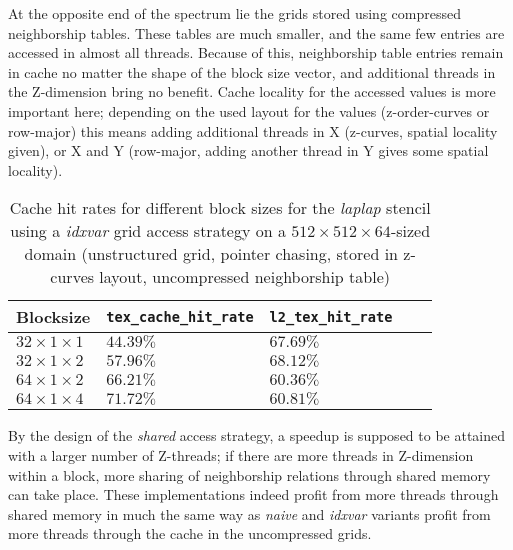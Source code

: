 At the opposite end of the spectrum lie the grids stored using compressed neighborship tables. These tables are much smaller, and the same few entries are accessed in almost all threads. Because of this, neighborship table entries remain in cache no matter the shape of the block size vector, and additional threads in the Z-dimension bring no benefit. Cache locality for the accessed values is more important here; depending on the used layout for the values (z-order-curves or row-major) this means adding additional threads in X (z-curves, spatial locality given), or X and Y (row-major, adding another thread in Y gives some spatial locality).

\begin{table}
	\begin{tabular}{l l l p{2cm} p{2cm}}
		Blocksize & \texttt{tex\_\allowbreak cache\_\allowbreak hit\_\allowbreak rate} & \texttt{l2\_\allowbreak tex\_\allowbreak hit\_\allowbreak rate} \\
		\hline
		$32\times 1\times 1$ & $44.39\%$ & $67.69\%$ \\
		$32\times 1\times 2$ & $57.96\%$ & $68.12\%$ \\
		$64\times 1\times 2$ & $66.21\%$ & $60.36\%$ \\
		$64\times 1\times 4$ & $71.72\%$ & $60.81\%$
	\end{tabular}
	\caption{\label{tab:laplap-blocksize-metrics} Cache hit rates for different block sizes for the \emph{laplap} stencil using a \emph{idxvar} grid access strategy on a $512\times 512\times 64$-sized domain (unstructured grid, pointer chasing, stored in z-curves layout, uncompressed neighborship table)}
\end{table}

By the design of the \emph{shared} access strategy, a speedup is supposed to be attained with a larger number of Z-threads; if there are more threads in Z-dimension within a block, more sharing of neighborship relations through shared memory can take place. These implementations indeed profit from more threads through shared memory in much the same way as \emph{naive} and \emph{idxvar} variants profit from more threads through the cache in the uncompressed grids.

